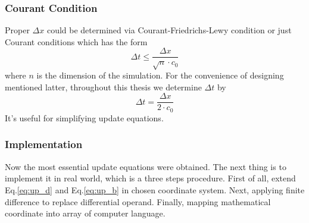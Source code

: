 \subsubsection{Courant Condition}
Proper $\Delta x$ could be determined via Courant-Friedrichs-Lewy condition or just Courant conditions which has the
form
\begin{equation}
  \Delta t \le \frac{\Delta x}{\sqrt{n}\cdot c_0}
\end{equation}
where $n$ is the dimension of the simulation. For the convenience of designing mentioned latter, throughout this thesis we
determine $\Delta t$ by
\begin{equation}
  \Delta t = \frac{\Delta x}{2 \cdot c_0}
\end{equation}
It's useful for simplifying update equations.

\subsubsection{Implementation}
Now the most essential update equations were obtained. The next thing is to implement it in real world, which is a three
steps procedure. First of all, extend Eq.\ref{eq:up_d} and Eq.\ref{eq:up_b} in chosen coordinate system. Next, applying
finite difference to replace differential operand. Finally, mapping mathematical coordinate into array of computer
language.

